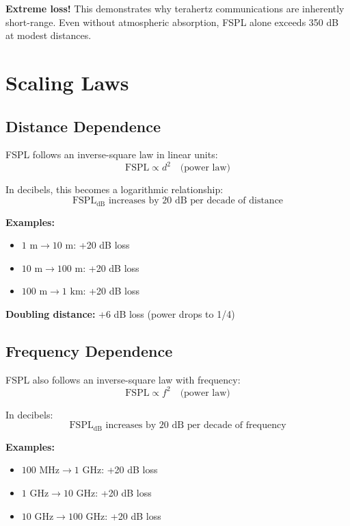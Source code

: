 \textbf{Extreme loss!} This demonstrates why terahertz communications are inherently short-range. Even without atmospheric absorption, FSPL alone exceeds 350 dB at modest distances.

\section{Scaling Laws}
\label{sec:scaling-laws}

\subsection{Distance Dependence}

FSPL follows an inverse-square law in linear units:
\begin{equation}
\text{FSPL} \propto d^2 \quad \text{(power law)}
\end{equation}

In decibels, this becomes a logarithmic relationship:
\begin{equation}
\text{FSPL}_{\text{dB}} \text{ increases by 20 dB per decade of distance}
\end{equation}

\textbf{Examples:}
\begin{itemize}
\item $1 \text{ m} \rightarrow 10 \text{ m}$: +20 dB loss
\item $10 \text{ m} \rightarrow 100 \text{ m}$: +20 dB loss
\item $100 \text{ m} \rightarrow 1 \text{ km}$: +20 dB loss
\end{itemize}

\textbf{Doubling distance:} +6 dB loss (power drops to 1/4)

\subsection{Frequency Dependence}

FSPL also follows an inverse-square law with frequency:
\begin{equation}
\text{FSPL} \propto f^2 \quad \text{(power law)}
\end{equation}

In decibels:
\begin{equation}
\text{FSPL}_{\text{dB}} \text{ increases by 20 dB per decade of frequency}
\end{equation}

\textbf{Examples:}
\begin{itemize}
\item $100 \text{ MHz} \rightarrow 1 \text{ GHz}$: +20 dB loss
\item $1 \text{ GHz} \rightarrow 10 \text{ GHz}$: +20 dB loss
\item $10 \text{ GHz} \rightarrow 100 \text{ GHz}$: +20 dB loss
\end{itemize}

